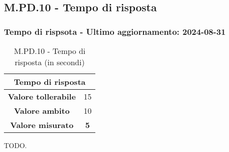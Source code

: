\subsection{M.PD.10 - Tempo di risposta}

\subsubsection*{Tempo di rispsota - Ultimo aggiornamento: 2024-08-31}

\begin{table}[H]
  \centering
  \begin{tabular}{|c|c|}
      \hline
      \multicolumn{2}{|c|}{Tempo di risposta} \\
      \hline
      \textbf{Valore tollerabile} & 15 \\
      \hline
      \textbf{Valore ambito} & 10 \\
      \hline
      \textbf{Valore misurato} & \textbf{5} \\
      \hline
  \end{tabular}
  \caption{M.PD.10 - Tempo di risposta (in secondi)}
\end{table}

\par TODO.